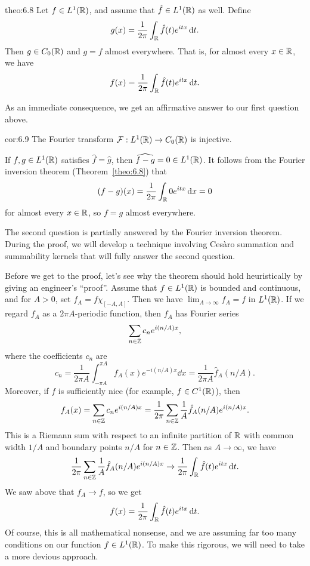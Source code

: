 \begin{theo}{theo:6.8}
    Let $f \in L^1(\mathbb{R})$, and assume that $\hat f \in L^1(\mathbb{R})$ as well. Define 
    \[ g(x) = \frac{1}{2\pi} \int_{\mathbb{R}} \hat f(t) e^{itx}\,\mathrm{d} t. \] 
    Then $g \in C_0(\mathbb{R})$ and $g = f$ almost everywhere. That is, for 
    almost every $x \in \mathbb{R}$, we have 
    \[ f(x) = \frac{1}{2\pi} \int_{\mathbb{R}} \hat f(t) e^{itx}\,\mathrm{d} t. \]
\end{theo}

As an immediate consequence, we get an affirmative answer to our first 
question above. 

\begin{cor}{cor:6.9}
    The Fourier transform ${\cal F} : L^1(\mathbb{R}) \to C_0(\mathbb{R})$ is injective.
\end{cor}
\begin{pf}
    If $f, g \in L^1(\mathbb{R})$ satisfies $\hat f = \hat g$, then 
    $\widehat{f-g} = 0 \in L^1(\mathbb{R})$. It follows from the Fourier inversion 
    theorem (Theorem~\ref{theo:6.8}) that 
    \[ (f - g)(x) = \frac{1}{2\pi} \int_{\mathbb{R}} 0 e^{itx}\,\mathrm{d} x = 0 \] 
    for almost every $x \in \mathbb{R}$, so $f = g$ almost everywhere. 
\end{pf}

The second question is partially answered by the Fourier inversion theorem. 
During the proof, we will develop a technique involving Ces\`aro summation 
and summability kernels that will fully answer the second question. 

Before we get to the proof, let's see why the theorem should hold heuristically 
by giving an engineer's ``proof''. Assume that $f \in L^1(\mathbb{R})$ is bounded 
and continuous, and for $A > 0$, set $f_A = f\chi_{[-A, A]}$. Then 
we have $\lim_{A\to\infty} f_A = f$ in $L^1(\mathbb{R})$. If we regard $f_A$ as a
$2\pi A$-periodic function, then $f_A$ has Fourier series 
\[ \sum_{n\in\mathbb{Z}} c_n e^{i(n/A)x}, \] 
where the coefficients $c_n$ are 
\[ c_n = \frac{1}{2\pi A} \int_{-\pi A}^{\pi A} f_A(x) e^{-i(n/A)x} \dd x 
= \frac{1}{2\pi A} \hat f_A(n/A). \] 
Moreover, if $f$ is sufficiently nice (for example, $f \in C^1(\mathbb{R})$), then 
\[ f_A(x) = \sum_{n\in\mathbb{Z}} c_n e^{i(n/A)x} = \frac{1}{2\pi} 
\sum_{n\in\mathbb{Z}} \frac{1}{A} \hat f_A(n/A) e^{i(n/A)x}. \] 
This is a Riemann sum with respect to an infinite partition of $\mathbb{R}$ 
with common width $1/A$ and boundary points $n/A$ for $n \in \mathbb{Z}$. 
Then as $A \to \infty$, we have 
\[ \frac{1}{2\pi} \sum_{n\in\mathbb{Z}} \frac{1}{A} \hat f_A(n/A) e^{i(n/A)x} 
\to \frac{1}{2\pi} \int_{\mathbb{R}} \hat f(t) e^{itx}\,\mathrm{d} t. \] 
We saw above that $f_A \to f$, so we get 
\[ f(x) = \frac{1}{2\pi} \int_{\mathbb{R}} \hat f(t) e^{itx}\,\mathrm{d} t. \] 
Of course, this is all mathematical nonsense, and we are assuming far 
too many conditions on our function $f \in L^1(\mathbb{R})$. To make this rigorous, 
we will need to take a more devious approach. 

